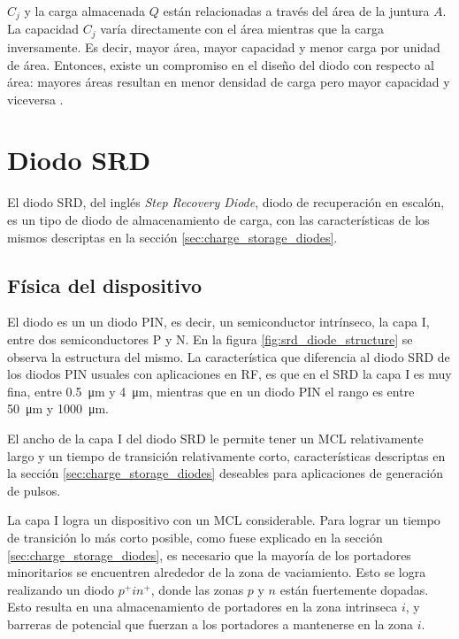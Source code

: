 $C_j$ y la carga almacenada $Q$ están relacionadas a través del área de la
juntura $A$. La capacidad $C_j$ varía directamente con el área mientras que la
carga inversamente. Es decir, mayor área, mayor capacidad y menor carga por
unidad de área. Entonces, existe un compromiso en el diseño del diodo con
respecto al área: mayores áreas resultan en menor densidad de carga pero mayor
capacidad y viceversa \cite{moll1962}.

\section{Diodo SRD}
\label{sec:srd_diode}

El diodo SRD, del inglés \textit{Step Recovery Diode}, diodo de recuperación en
escalón, es un tipo de diodo de almacenamiento de carga, con las características
de los mismos descriptas en la sección \ref{sec:charge_storage_diodes}.

\subsection{Física del dispositivo}

El diodo es un un diodo PIN, es decir, un semiconductor intrínseco, la capa I,
entre dos semiconductores P y N. En la figura \ref{fig:srd_diode_structure} se
observa la estructura del mismo. La característica que diferencia al diodo SRD
de los diodos PIN usuales con aplicaciones en RF, es que en el SRD la capa I es
muy fina, entre \qty{0.5}{\micro\meter} y \qty{4}{\micro\meter}, mientras que en
un diodo PIN el rango es entre \qty{50}{\micro\meter} y
\qty{1000}{\micro\meter}.

El ancho de la capa I del diodo SRD le permite tener un MCL relativamente largo
y un tiempo de transición relativamente corto, características descriptas en
la sección \ref{sec:charge_storage_diodes} deseables para aplicaciones de generación de pulsos.

La capa I logra un dispositivo con un MCL considerable. Para lograr un tiempo de
transición lo más corto posible, como fuese explicado en la sección
\ref{sec:charge_storage_diodes}, es necesario que la mayoría de los portadores
minoritarios se encuentren alrededor de la zona de vaciamiento. Esto se logra
realizando un diodo $p^+in^+$, donde las zonas $p$ y $n$ están fuertemente
dopadas. Esto resulta en una almacenamiento de portadores en la zona intrinseca
$i$, y barreras de potencial que fuerzan a los portadores a mantenerse en la
zona $i$.

